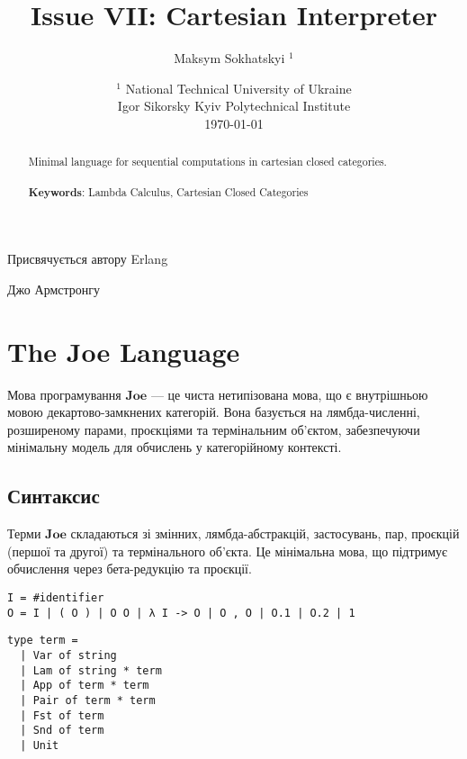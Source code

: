 \documentclass{article}
\theoremstyle{definition}
\begin{document}
\title{Issue VII: Cartesian Interpreter}
\author{Maksym Sokhatskyi $^1$}
\date{ $^1$ National Technical University of Ukraine \\
       \small Igor Sikorsky Kyiv Polytechnical Institute \\
       \today }

\maketitle

\begin{abstract}

Minimal language for sequential computations in cartesian closed categories.
\\
\\
{\bf Keywords}: Lambda Calculus, Cartesian Closed Categories
\end{abstract}

\ifincludeTOC
  \tableofcontents
\fi

\newpage

\epigraph{Присвячується автору Erlang}{Джо Армстронгу}

\section{The Joe Language}

Мова програмування $\mathbf{Joe}$ — це чиста нетипізована мова, що є внутрішньою мовою декартово-замкнених категорій. Вона базується на лямбда-численні, розширеному парами, проєкціями та термінальним об’єктом, забезпечуючи мінімальну модель для обчислень у категорійному контексті.

\subsection{Синтаксис}

Терми $\mathbf{Joe}$ складаються зі змінних, лямбда-абстракцій, застосувань, пар, проєкцій (першої та другої) та термінального об’єкта. Це мінімальна мова, що підтримує обчислення через бета-редукцію та проєкції.

\begin{lstlisting}[mathescape=true]
I = #identifier
O = I | ( O ) | O O | λ I -> O | O , O | O.1 | O.2 | 1
\end{lstlisting}

\begin{lstlisting}[mathescape=true]
type term =
  | Var of string
  | Lam of string * term
  | App of term * term
  | Pair of term * term
  | Fst of term
  | Snd of term
  | Unit
\end{lstlisting}
\end{document}

